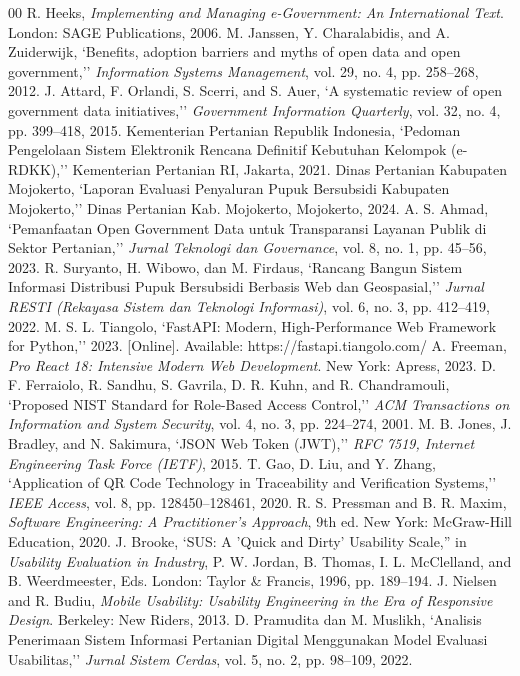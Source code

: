 \documentclass[conference]{IEEEtran}
\begin{document}
\begin{thebibliography}{00}
 R. Heeks, \textit{Implementing and Managing e-Government: An International Text}. London: SAGE Publications, 2006.
 M. Janssen, Y. Charalabidis, and A. Zuiderwijk, `Benefits, adoption barriers and myths of open data and open government,'' \textit{Information Systems Management}, vol. 29, no. 4, pp. 258--268, 2012.
 J. Attard, F. Orlandi, S. Scerri, and S. Auer, `A systematic review of open government data initiatives,'' \textit{Government Information Quarterly}, vol. 32, no. 4, pp. 399--418, 2015.
 Kementerian Pertanian Republik Indonesia, `Pedoman Pengelolaan Sistem Elektronik Rencana Definitif Kebutuhan Kelompok (e-RDKK),'' Kementerian Pertanian RI, Jakarta, 2021.
 Dinas Pertanian Kabupaten Mojokerto, `Laporan Evaluasi Penyaluran Pupuk Bersubsidi Kabupaten Mojokerto,'' Dinas Pertanian Kab. Mojokerto, Mojokerto, 2024.
 A. S. Ahmad, `Pemanfaatan Open Government Data untuk Transparansi Layanan Publik di Sektor Pertanian,'' \textit{Jurnal Teknologi dan Governance}, vol. 8, no. 1, pp. 45--56, 2023.
 R. Suryanto, H. Wibowo, dan M. Firdaus, `Rancang Bangun Sistem Informasi Distribusi Pupuk Bersubsidi Berbasis Web dan Geospasial,'' \textit{Jurnal RESTI (Rekayasa Sistem dan Teknologi Informasi)}, vol. 6, no. 3, pp. 412--419, 2022.
 M. S. L. Tiangolo, `FastAPI: Modern, High-Performance Web Framework for Python,'' 2023. [Online]. Available: https://fastapi.tiangolo.com/
 A. Freeman, \textit{Pro React 18: Intensive Modern Web Development}. New York: Apress, 2023.
 D. F. Ferraiolo, R. Sandhu, S. Gavrila, D. R. Kuhn, and R. Chandramouli, `Proposed NIST Standard for Role-Based Access Control,'' \textit{ACM Transactions on Information and System Security}, vol. 4, no. 3, pp. 224--274, 2001.
 M. B. Jones, J. Bradley, and N. Sakimura, `JSON Web Token (JWT),'' \textit{RFC 7519, Internet Engineering Task Force (IETF)}, 2015.
 T. Gao, D. Liu, and Y. Zhang, `Application of QR Code Technology in Traceability and Verification Systems,'' \textit{IEEE Access}, vol. 8, pp. 128450--128461, 2020.
 R. S. Pressman and B. R. Maxim, \textit{Software Engineering: A Practitioner's Approach}, 9th ed. New York: McGraw-Hill Education, 2020.
 J. Brooke, `SUS: A 'Quick and Dirty' Usability Scale,'' in \textit{Usability Evaluation in Industry}, P. W. Jordan, B. Thomas, I. L. McClelland, and B. Weerdmeester, Eds. London: Taylor \& Francis, 1996, pp. 189--194.
 J. Nielsen and R. Budiu, \textit{Mobile Usability: Usability Engineering in the Era of Responsive Design}. Berkeley: New Riders, 2013.
 D. Pramudita dan M. Muslikh, `Analisis Penerimaan Sistem Informasi Pertanian Digital Menggunakan Model Evaluasi Usabilitas,'' \textit{Jurnal Sistem Cerdas}, vol. 5, no. 2, pp. 98--109, 2022.
\end{thebibliography}
\end{document}
